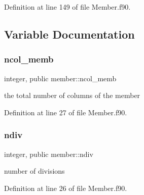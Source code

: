 Definition at line 149 of file Member.\+f90.



\subsection{Variable Documentation}
\mbox{\label{namespacemember_a20895477b227a3352a4e758b21b01bf8}} 
\subsubsection{\texorpdfstring{ncol\+\_\+memb}{ncol\_memb}}
{\footnotesize\ttfamily integer, public member\+::ncol\+\_\+memb}



the total number of columns of the member 



Definition at line 27 of file Member.\+f90.

\mbox{\label{namespacemember_a3e6a3b0896edb5c30c113dc22ab7181a}} 
\subsubsection{\texorpdfstring{ndiv}{ndiv}}
{\footnotesize\ttfamily integer, public member\+::ndiv}



number of divisions 



Definition at line 26 of file Member.\+f90.

